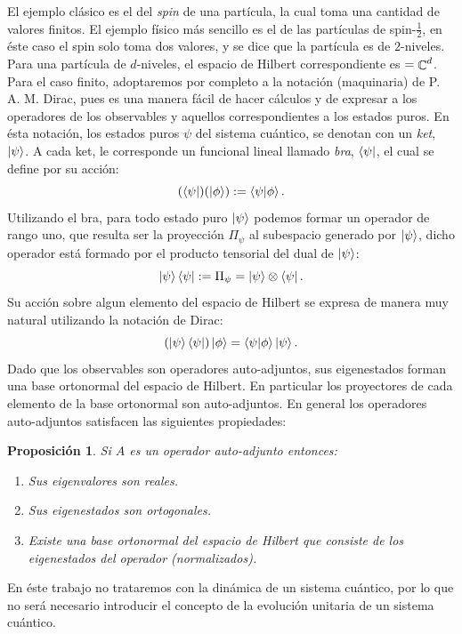 \documentclass[a4paper]{report}
\DeclareMathOperator{\C}{\mathbb{C}}
\let\H\relax
\DeclareMathOperator{\H}{\mathcal H}
\newtheorem{proposition}{Proposición}
\begin{document}
  El ejemplo clásico es el del \textit{spin} de una
  partícula, la cual toma una cantidad de valores finitos.
  El ejemplo físico más sencillo es el de las partículas de
  spin-$\frac{1}{2}$, en éste caso el spin solo toma dos
  valores, y se dice que la partícula es de $2$-niveles.
  Para una partícula de $d$-niveles, el espacio de Hilbert
  correspondiente es $\H  = \C^{d}$. Para el caso finito,
  adoptaremos por completo a la notación (maquinaria) de P.
  A. M. Dirac, pues es una manera fácil de hacer cálculos y
  de expresar a los operadores de los observables y aquellos
  correspondientes a los estados puros. En ésta notación,
  los estados puros $\psi$ del sistema cuántico, se denotan
  con un \textit{ket}, $\ket \psi$. A cada ket, le
  corresponde un funcional lineal llamado \textit{bra},
  $\bra \psi$, el cual se define por su acción:
  \[
    (\bra \psi)(\ket{\phi})
    := \braket{\psi|\phi}.
  \] 
  Utilizando el bra, para todo estado puro $\ket{\psi}$ podemos
  formar un operador de rango uno, que resulta ser la
  proyección $\Pi_\psi$ al subespacio generado por
  $\ket{\psi}$,
  dicho operador está formado por el producto tensorial del
  dual de $\ket{\psi}$:
  \begin{equation}
    \ket \psi \bra \psi
    := \Pi_\psi
    = \ket \psi \otimes \bra \psi.
  \end{equation} 
  Su acción sobre algun elemento del espacio de Hilbert se
  expresa de manera muy natural utilizando la notación de
  Dirac:
  \[
    \left(\ket \psi \bra \psi\right) \ket \phi
    = \braket{\psi|\phi} \ket \psi.
  \] 
  Dado que los observables son operadores auto-adjuntos, sus
  eigenestados forman una base ortonormal del espacio de
  Hilbert. En particular los proyectores de cada elemento de
  la base ortonormal son auto-adjuntos. En general los
  operadores auto-adjuntos satisfacen las siguientes
  propiedades:
  \begin{proposition}
    Si $A$ es un operador auto-adjunto entonces:
    \begin{enumerate}
      \item Sus eigenvalores son reales.
      \item Sus eigenestados son ortogonales.
      \item Existe una base ortonormal del espacio de
        Hilbert que consiste de los eigenestados del
        operador (normalizados).
    \end{enumerate}
  \end{proposition}
  En éste trabajo no trataremos con la dinámica de un
  sistema cuántico, por lo que no será necesario introducir
  el concepto de la evolución unitaria de un sistema
  cuántico.
\end{document}
